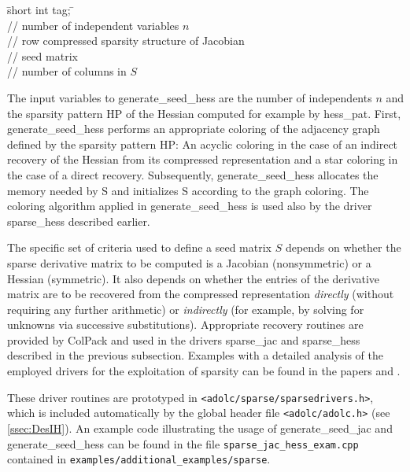 \documentclass[11pt,twoside]{article}
\begin{document}
\begin{tabbing}
\hspace{0.5in}\={\sf short int tag;} \hspace{1.3in}\= \kill    %
\\
 \> // number of independent variables $n$\\
 \> // row compressed sparsity structure
of Jacobian\\
 \> // seed matrix\\
 \> // number of columns in $S$
\end{tabbing}
The input variables to {\sf generate\_seed\_hess} are the number of independents $n$
and the sparsity pattern {\sf HP} of the Hessian computed for example
by {\sf hess\_pat}. First, {\sf generate\_seed\_hess} performs an
appropriate coloring of the adjacency graph defined by the sparsity
pattern {\sf HP}: An acyclic coloring in the case of an indirect recovery of the Hessian from its
    compressed representation and a star coloring in the case of a direct recovery.
 Subsequently, {\sf generate\_seed\_hess} allocates the memory needed by {\sf
 S} and initializes {\sf S} according to the graph coloring.
The coloring algorithm applied in {\sf
  generate\_seed\_hess} is used also by the driver {\sf sparse\_hess}
described earlier.

The specific set of criteria used to define a seed matrix $S$ depends
on whether the sparse derivative matrix 
to be computed is a Jacobian (nonsymmetric) or a Hessian (symmetric).  
It also depends on whether the entries of the derivative matrix  are to be
recovered from the compressed representation \emph{directly}
(without requiring any further arithmetic) or \emph{indirectly} (for
example, by solving for unknowns via successive substitutions).
Appropriate recovery routines are provided by ColPack and used 
in the drivers {\sf sparse\_jac} and {\sf sparse\_hess} described in
the previous subsection. Examples with a detailed analysis of the 
employed drivers for the exploitation of sparsity can be found in the
papers \cite{GePoTaWa06} and \cite{GePoWa08}.


These driver routines are prototyped in 
\verb=<adolc/sparse/sparsedrivers.h>=, which is included automatically by the
global header file \verb=<adolc/adolc.h>= (see \autoref{ssec:DesIH}). 
An example code illustrating the usage of {\sf
generate\_seed\_jac} and {\sf generate\_seed\_hess} can be found in the file 
\verb=sparse_jac_hess_exam.cpp= contained in \verb=examples/additional_examples/sparse=.
%
\end{document}
